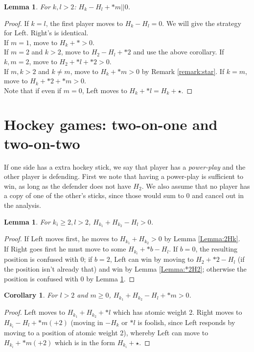 \documentclass{amsart}
\newtheorem{corollary}[definition]{Corollary}
\newtheorem{lemma}[definition]{Lemma}
\begin{document}
\begin{lemma} For $k,l>2$:
\label{Lemma:jk>2}
$H_k-H_l+*m||0$.
\end{lemma}
\begin{proof}
If $k=l$, the first player moves to $H_k-H_l=0$.
We will give the strategy for Left.  Right's is identical.\\
If $m=1$, move to $H_k+*>0$.\\
If $m=2$ and $k>2$, move to $H_2-H_l+*2$ and use the above corollary.  If $k,m=2$, move to $H_2+*l+*2>0$.  \\
If $m,k> 2$ and $k\neq m$, move to $H_k+*m>0$ by Remark \ref{remark:star}.  If $k=m$, move to $H_k+*2+*m>0$.\\
Note that if even if $m=0$, Left moves to $H_k+*l=H_k+\star$.
\end{proof}

\section{Hockey games: two-on-one and two-on-two}
If one side has a extra hockey stick, we say that player has a \emph{power-play} and the other player is defending.  First we note that having a power-play is sufficient to win, as long as the defender does not have $H_2$.  We also assume that no player has a copy of one of the other's sticks, since those would sum to 0 and cancel out in the analysis.
\begin{lemma}
\label{Lemma:mnk1}
For $k_i\geq 2, l>2$, $H_{k_1}+H_{k_2}-H_l>0$.
\end{lemma}
\begin{proof}
If Left moves first, he moves to $H_{k_1}+H_{k_2}>0$ by Lemma \ref{Lemma:2Hk}.\\
If Right goes first he must move to some $H_{k_i}+*b-H_l$.  If $b=0$, the resulting position is confused with 0; if $b=2$, Left can win by moving to $H_2+*2-H_l$ (if the position isn't already that) and win by Lemma \ref{Lemma:*2H2}; otherwise the position is confused with 0 by Lemma \ref{Lemma:jk>2}.

\end{proof}


\begin{corollary}
\label{Coro:mnk1}
For $l>2$ and $m\geq 0$, $H_{k_1}+H_{k_2}-H_l+*m>0$.
\end{corollary}
\begin{proof}
Left moves to $H_{k_1}+H_{k_2}+*l$ which has atomic weight 2.  Right moves to $H_{k_i}-H_l+*m(+2)$ (moving in $-H_k$ or $*l$ is foolish, since Left responds by moving to a position of atomic weight 2), whereby Left can move to $H_{k_i}+*m(+2)$ which is in the form $H_{k_i}+\star$.
\end{proof}
\end{document}
